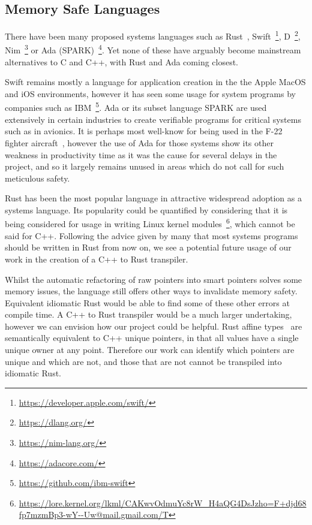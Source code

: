 \documentclass{proposal}
\begin{document}
    \subsection{Memory Safe Languages}\label{subsec:rust}

    There have been many proposed systems languages such as Rust~\cite{Balasubramanian2017}, Swift~\footnote{\url{https://developer.apple.com/swift/}}, D~\footnote{\url{https://dlang.org/}}, Nim~\footnote{\url{https://nim-lang.org/}} or Ada (SPARK)~\footnote{\url{https://adacore.com/}}.
    Yet none of these have arguably become mainstream alternatives to C and C++, with Rust and Ada coming closest.

    Swift remains mostly a language for application creation in the the Apple MacOS and iOS environments, however it has seen some usage for system programs by companies such as IBM~\footnote{\url{https://github.com/ibm-swift}}.
    Ada or its subset language SPARK are used extensively in certain industries to create verifiable programs for critical systems such as in avionics.
    It is perhaps most well-know for being used in the F-22 fighter aircraft~\cite{Malas1997}, however the use of Ada for those systems show its other weakness in productivity time as it was the cause for several delays in the project, and so it largely remains unused in areas which do not call for such meticulous safety.

    Rust has been the most popular language in attractive widespread adoption as a systems language.
    Its popularity could be quantified by considering that it is being considered for usage in writing Linux kernel modules~\footnote{\url{https://lore.kernel.org/lkml/CAKwvOdmuYc8rW_H4aQG4DsJzho=F+djd68fp7mzmBp3-wY--Uw@mail.gmail.com/T}}, which cannot be said for C++.
    Following the advice given by many that most systems programs should be written in Rust from now on, we see a potential future usage of our work in the creation of a C++ to Rust transpiler.

    Whilst the automatic refactoring of raw pointers into smart pointers solves some memory issues, the language still offers other ways to invalidate memory safety.
    Equivalent idiomatic Rust would be able to find some of these other errors at compile time.
    A C++ to Rust transpiler would be a much larger undertaking, however we can envision how our project could be helpful.
    Rust affine types~\cite{Balasubramanian2017} are semantically equivalent to C++ unique pointers, in that all values have a single unique owner at any point.
    Therefore our work can identify which pointers are unique and which are not, and those that are not cannot be transpiled into idiomatic Rust.
\end{document}
